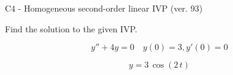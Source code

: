 \begin{exercise}
  \begin{exerciseTitle}C4 - Homogeneous second-order linear IVP (ver. 93)\end{exerciseTitle}
  \begin{exerciseStatement}
    
Find the solution to the given IVP.

    
\[y''+4y = 0 \hspace{1em} y(0) = 3 , y'(0) = 0\]

  \end{exerciseStatement}
  \begin{exerciseAnswer}
    
\[y= 3 \, \cos\left(2 \, t\right)\]

  \end{exerciseAnswer}
\end{exercise}